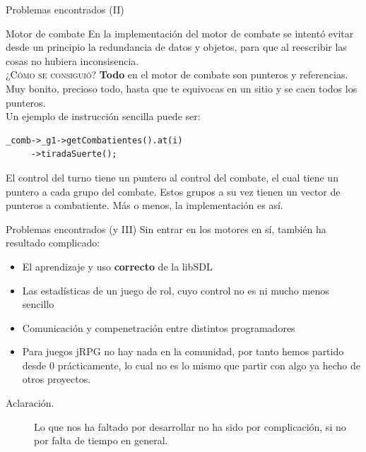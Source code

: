 \documentclass[9pt,xcolor=svgnames]{beamer}
\begin{document}
   \begin{frame}[fragile=singleslide]{Problemas encontrados (II)}
     \begin{block}{Motor de combate}
       En la implementación del motor de combate se intentó evitar desde un
       principio la redundancia de datos y objetos, para que al reescribir
       las cosas no hubiera inconsisencia.\\
       
      \vspace*{0.3cm}
       \textsc{¿Cómo se consiguió?} \textbf{Todo} en el motor de combate
      son punteros y referencias. Muy bonito, precioso todo, hasta que
      te equivocas en un sitio y se caen todos los punteros.\\
      Un ejemplo de instrucción sencilla puede ser:
\begin{verbatim}
_comb->_g1->getCombatientes().at(i)
     ->tiradaSuerte();
\end{verbatim}
       
       El control del turno tiene un puntero al control del combate, el cual
       tiene un puntero a cada grupo del combate. Estos grupos a su vez tienen
       un vector de punteros a combatiente. Más o menos, la
      implementación es así.
     \end{block}
   \end{frame}

   \begin{frame}{Problemas encontrados (y III)}
     Sin entrar en los motores en sí, también ha resultado complicado:
     \begin{itemize}
     \item El aprendizaje y uso \textbf{correcto} de la libSDL
     \item Las estadísticas de un juego de rol, cuyo control no es ni
	   mucho menos sencillo
     \item Comunicación y compenetración entre distintos programadores
     \item Para juegos jRPG no hay nada en la comunidad, por tanto
       hemos partido desde 0 prácticamente, lo cual no es lo mismo
       que partir con algo ya hecho de otros proyectos.
     \end{itemize}

    \begin{description}
     \item[Aclaración.] Lo que nos ha faltado por desarrollar no ha 
     sido por complicación, si no por falta de tiempo en general.
    \end{description}
   \end{frame}
 
\end{document}
